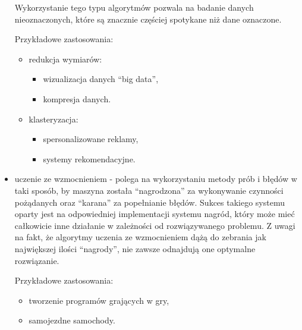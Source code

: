 \begin{itemize}
\begin{itemize}
    \end{itemize} 
    Wykorzystanie tego typu algorytmów pozwala na badanie danych nieoznaczonych,
    które są znacznie częściej spotykane niż dane oznaczone.
    
    Przykładowe zastosowania:
    \begin{itemize}
        \item redukcja wymiarów:
        \begin{itemize}
            \item wizualizacja danych ``big data'',
            \item kompresja danych.
        \end{itemize}
        \item klasteryzacja:
        \begin{itemize}
            \item spersonalizowane reklamy,
            \item systemy rekomendacyjne.
        \end{itemize}
    \end{itemize}
    \item uczenie ze wzmocnieniem -
    polega na wykorzystaniu metody prób i błędów w taki sposób, by maszyna została
    ``nagrodzona'' za wykonywanie czynności pożądanych oraz ``karana'' za popełnianie błędów. 
    Sukces takiego systemu oparty jest na odpowiedniej implementacji systemu nagród, który może 
    mieć całkowicie inne działanie w zależności od rozwiązywanego problemu. 
    Z uwagi na fakt, że algorytmy uczenia ze wzmocnieniem dążą do zebrania jak największej
    ilości ``nagrody'', nie zawsze odnajdują one optymalne rozwiązanie.
    
    Przykładowe zastosowania:
    \begin{itemize}
        \item tworzenie programów grających w gry,
        \item samojezdne samochody.
    \end{itemize}
\end{itemize} 

